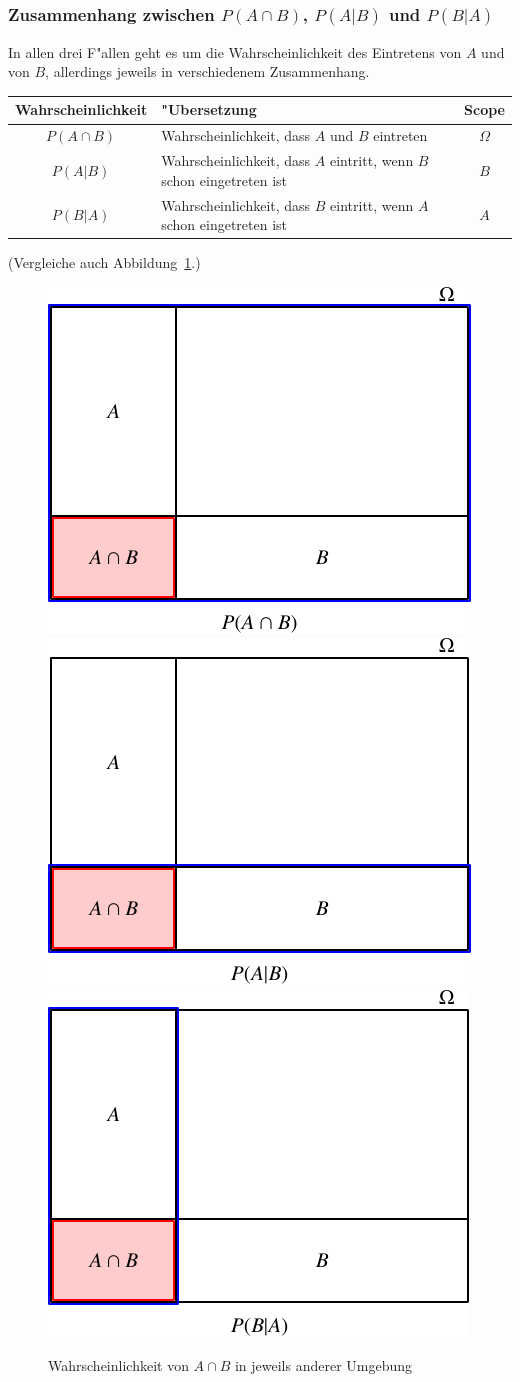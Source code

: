 \subsubsection{Zusammenhang zwischen \texorpdfstring{$P(A\cap B)$}{P(A geschnitten B)}, \texorpdfstring{$P(A|B)$}{P(A bedingt B)} und \texorpdfstring{$P(B|A)$}{P(B bedingt A)}}
In allen drei F"allen geht es um die Wahrscheinlichkeit des Eintretens
von $A$ und von $B$, allerdings jeweils in verschiedenem
Zusammenhang.
\begin{center}
\begin{tabular}{|c|l|c|}
\hline
Wahrscheinlichkeit&"Ubersetzung&Scope\\
\hline
$P(A\cap B)$&\strut Wahrscheinlichkeit, dass $A$ und $B$ eintreten\strut &$\Omega$\\
$P(A|B)$&\begin{minipage}[t]{3.0in}\strut Wahrscheinlichkeit, dass $A$ eintritt, wenn $B$ schon eingetreten ist\strut \end{minipage}&$B$\\
$P(B|A)$&\begin{minipage}[t]{3.0in}\strut Wahrscheinlichkeit, dass $B$ eintritt, wenn $A$ schon eingetreten ist\strut \end{minipage}&$A$\\
\hline
\end{tabular}
\end{center}
(Vergleiche auch Abbildung~\ref{condprob}.)
\begin{figure}
\begin{center}
\includegraphics[width=0.3\hsize]{images/abhaengigkeit-3}\quad
\includegraphics[width=0.3\hsize]{images/abhaengigkeit-5}\quad
\includegraphics[width=0.3\hsize]{images/abhaengigkeit-4}
\end{center}
\caption{Wahrscheinlichkeit von $A\cap B$ in jeweils anderer Umgebung
\label{condprob}}
\end{figure}

